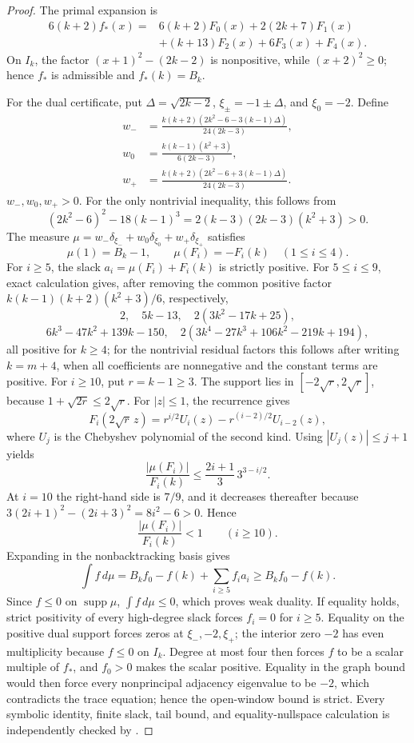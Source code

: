 \documentclass[a4paper,10pt,reqno]{amsart}
\theoremstyle{plain}
\theoremstyle{definition}
\theoremstyle{remark}
\newcommand{\RepoTag}{v2.3.0}
\newcommand{\codefile}[1]{%
  \href{https://github.com/SamPetkov/wow284/blob/\RepoTag/#1}{\path{#1}}}
\begin{document}
\begin{proof}
The primal expansion is
\[
\begin{aligned}
6(k+2)f_*(x)={}&6(k+2)F_0(x)+2(2k+7)F_1(x)\\
&+(k+13)F_2(x)+6F_3(x)+F_4(x).
\end{aligned}
\]
On \(I_k\), the factor \((x+1)^2-(2k-2)\) is nonpositive, while
\((x+2)^2\ge0\); hence \(f_*\) is admissible and \(f_*(k)=B_k\).

For the dual certificate, put \(\Delta=\sqrt{2k-2}\),
\(\xi_\pm=-1\pm\Delta\), and \(\xi_0=-2\).  Define
\begin{align*}
w_-&=\frac{k(k+2)(2k^2-6-3(k-1)\Delta)}{24(2k-3)},\\
w_0&=\frac{k(k-1)(k^2+3)}{6(2k-3)},\\
w_+&=\frac{k(k+2)(2k^2-6+3(k-1)\Delta)}{24(2k-3)}.
\end{align*}
\(w_-,w_0,w_+>0\).  For the only nontrivial inequality, this follows from
\[
 (2k^2-6)^2-18(k-1)^3
 =2(k-3)(2k-3)(k^2+3)>0.
\]
The measure
\(\mu=w_-\delta_{\xi_-}+w_0\delta_{\xi_0}+w_+\delta_{\xi_+}\) satisfies
\[
 \mu(1)=B_k-1,
 \qquad \mu(F_i)=-F_i(k)\quad(1\le i\le4).
\]
For \(i\ge5\), the slack \(a_i=\mu(F_i)+F_i(k)\) is strictly positive.  For
\(5\le i\le9\), exact calculation gives, after removing the common positive
factor \(k(k-1)(k+2)(k^2+3)/6\), respectively,
\[
 2,\quad 5k-13,\quad 2(3k^2-17k+25),
\]
\[
 6k^3-47k^2+139k-150,
 \quad
 2(3k^4-27k^3+106k^2-219k+194),
\]
all positive for \(k\ge4\); for the nontrivial residual factors this follows
after writing \(k=m+4\), when all coefficients are nonnegative and the
constant terms are positive.  For \(i\ge10\), put \(r=k-1\ge3\).
The support lies in \([-2\sqrt r,2\sqrt r]\), because
\(1+\sqrt{2r}\le2\sqrt r\).  For \(|z|\le1\), the recurrence gives
\[
 F_i(2\sqrt r\,z)
 =r^{i/2}U_i(z)-r^{(i-2)/2}U_{i-2}(z),
\]
where \(U_j\) is the Chebyshev polynomial of the second kind.  Using
\(|U_j(z)|\le j+1\) yields
\[
 \frac{|\mu(F_i)|}{F_i(k)}
 \le \frac{2i+1}{3}\,3^{3-i/2}.
\]
At \(i=10\) the right-hand side is \(7/9\), and it decreases thereafter
because \(3(2i+1)^2-(2i+3)^2=8i^2-6>0\).  Hence
\[
 \frac{|\mu(F_i)|}{F_i(k)}<1\qquad(i\ge10).
\]
Expanding in the nonbacktracking basis gives
\[
 \int f\,d\mu
 =B_kf_0-f(k)+\sum_{i\ge5}f_i a_i
 \ge B_kf_0-f(k).
\]
Since \(f\le0\) on \(\operatorname{supp}\mu\),
\(\int f\,d\mu\le0\), which proves weak duality.
If equality holds, strict positivity of every high-degree slack forces
\(f_i=0\) for \(i\ge5\).  Equality on the positive dual support forces zeros
at \(\xi_-,-2,\xi_+\); the interior zero \(-2\) has even multiplicity because
\(f\le0\) on \(I_k\).  Degree at most four then forces \(f\) to be a scalar
multiple of \(f_*\), and \(f_0>0\) makes the scalar positive.  Equality in
the graph bound would then force every nonprincipal adjacency eigenvalue to be
\(-2\), which contradicts the trace equation; hence the open-window bound is
strict.  Every symbolic identity, finite slack, tail bound, and
equality-nullspace calculation is independently checked by
\codefile{scripts/verify_proof_audit_02_two_sided_lp.py}.
\end{proof}
\end{document}
